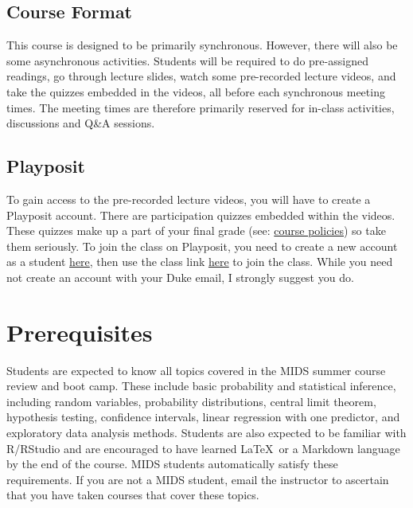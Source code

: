 \documentclass[11pt, a4paper]{article}
\begin{document}
\subsection{Course Format}
This course is designed to be primarily synchronous. However, there will also be some asynchronous activities. Students will be required to do pre-assigned readings, go through lecture slides, watch some pre-recorded lecture videos, and take the quizzes embedded in the videos, all before each synchronous meeting times. The meeting times are therefore primarily reserved for in-class activities, discussions and Q\&A sessions. %

\subsection{Playposit}
To gain access to the pre-recorded lecture videos, you will have to create a Playposit account. There are participation quizzes embedded within the videos. These quizzes make up a part of your final grade (see: \href{https://ids702-f21.olanrewajuakande.com/policies/}{course policies}) so take them seriously. To join the class on Playposit, you need to create a new account as a student \href{https://www.playposit.com/join}{here}, then use the class link \href{https://www.playposit.com/join-class/1403540-1083318}{here} to join the class. While you need not create an account with your Duke email, I strongly suggest you do.



\section{Prerequisites}
Students are expected to know all topics covered in the MIDS summer course review and boot camp. These include basic probability and statistical inference, including random variables, probability distributions, central limit theorem, hypothesis testing, confidence intervals, linear regression with one predictor, and exploratory data analysis methods. Students are also expected to be familiar with \textsf{R}/\textsf{RStudio} and are encouraged to have learned \LaTeX \ or a Markdown language by the end of the course. MIDS students automatically satisfy these requirements. If you are not a MIDS student, email the instructor to ascertain that you have taken courses that cover these topics.
\end{document}
